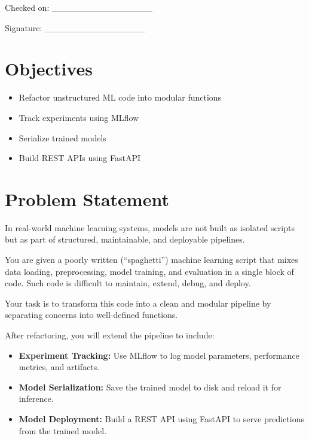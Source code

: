 \documentclass[12pt,a4paper]{article}
\begin{document}
\vspace{12pt}

\begin{flushright}
Checked on: \_\_\_\_\_\_\_\_\_\_\_\_\_\_\_\_

\vspace{6pt}
Signature: \_\_\_\_\_\_\_\_\_\_\_\_\_\_\_\_
\end{flushright}

\newpage

\section*{Objectives}
\begin{itemize}
\item Refactor unstructured ML code into modular functions
\item Track experiments using MLflow
\item Serialize trained models
\item Build REST APIs using FastAPI
\end{itemize}

\section*{Problem Statement}

In real-world machine learning systems, models are not built as isolated scripts but as part of structured, maintainable, and deployable pipelines.

You are given a poorly written (``spaghetti'') machine learning script that mixes data loading, preprocessing, model training, and evaluation in a single block of code. Such code is difficult to maintain, extend, debug, and deploy.

Your task is to transform this code into a clean and modular pipeline by separating concerns into well-defined functions.

After refactoring, you will extend the pipeline to include:

\begin{itemize}
\item \textbf{Experiment Tracking:} Use MLflow to log model parameters, performance metrics, and artifacts.
\item \textbf{Model Serialization:} Save the trained model to disk and reload it for inference.
\item \textbf{Model Deployment:} Build a REST API using FastAPI to serve predictions from the trained model.
\end{itemize}
\end{document}
